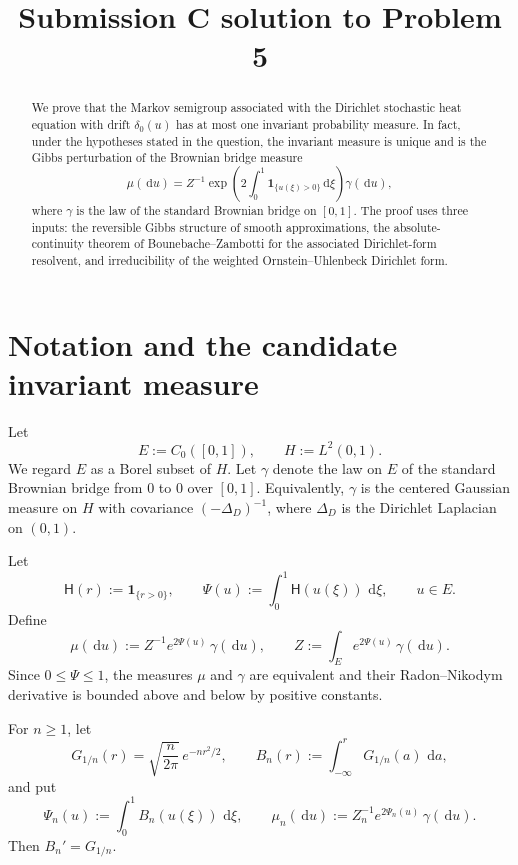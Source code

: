 \documentclass[11pt]{article}
\numberwithin{equation}{section}
\newcommand{\dd}{\,\mathrm d}
\newcommand{\1}{\mathbf 1}
\begin{document}
\title{Submission C solution to Problem 5}
\date{}
\maketitle


\begin{abstract}
We prove that the Markov semigroup associated with the Dirichlet stochastic heat
equation with drift $\delta_0(u)$ has at most one invariant probability measure.
In fact, under the hypotheses stated in the question, the invariant measure is unique
and is the Gibbs perturbation of the Brownian bridge measure
\[
        \mu(\dd u)=Z^{-1}\exp\!\left(2\int_0^1 \1_{\{u(\xi)>0\}}\dd \xi\right)\gamma(\dd u),
\]
where $\gamma$ is the law of the standard Brownian bridge on $[0,1]$.
The proof uses three inputs: the reversible Gibbs structure of smooth approximations,
the absolute-continuity theorem of Bounebache--Zambotti for the associated
Dirichlet-form resolvent, and irreducibility of the weighted Ornstein--Uhlenbeck
Dirichlet form.
\end{abstract}

\section{Notation and the candidate invariant measure}

Let
\[
        E:=C_0([0,1]),\qquad H:=L^2(0,1).
\]
We regard $E$ as a Borel subset of $H$. Let $\gamma$ denote the law on $E$ of the
standard Brownian bridge from $0$ to $0$ over $[0,1]$. Equivalently, $\gamma$ is the
centered Gaussian measure on $H$ with covariance $(-\Delta_D)^{-1}$, where
$\Delta_D$ is the Dirichlet Laplacian on $(0,1)$.

Let
\[
        \mathsf H(r):=\1_{\{r>0\}},\qquad
        \Psi(u):=\int_0^1 \mathsf H(u(\xi))\,\dd \xi,\qquad u\in E.
\]
Define
\begin{equation}\label{eq:mu-def}
        \mu(\dd u)
        := Z^{-1}e^{2\Psi(u)}\,\gamma(\dd u),
        \qquad
        Z:=\int_E e^{2\Psi(u)}\,\gamma(\dd u).
\end{equation}
Since $0\leq \Psi\leq 1$, the measures $\mu$ and $\gamma$ are equivalent and their
Radon--Nikodym derivative is bounded above and below by positive constants.

For $n\geq 1$, let
\[
        G_{1/n}(r)=\sqrt{\frac{n}{2\pi}}\,e^{-nr^2/2},\qquad
        B_n(r):=\int_{-\infty}^r G_{1/n}(a)\,\dd a,
\]
and put
\[
        \Psi_n(u):=\int_0^1 B_n(u(\xi))\,\dd \xi,\qquad
        \mu_n(\dd u):=Z_n^{-1}e^{2\Psi_n(u)}\,\gamma(\dd u).
\]
Then $B_n'=G_{1/n}$.
\end{document}

